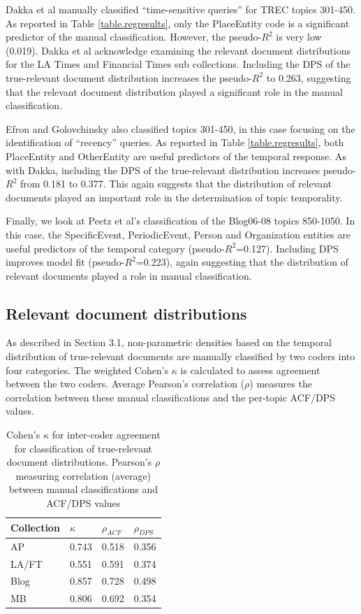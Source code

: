 \documentclass{sig-alternate}
\begin{document}
Dakka et al manually classified ``time-sensitive queries'' for TREC topics 301-450. As reported in Table \ref{table.regresults}, only the PlaceEntity code is a significant predictor of the manual classification. However, the pseudo-$R^2$ is very low (0.019).  Dakka et al acknowledge examining the relevant document distributions for the LA Times and Financial Times sub collections.  Including the DPS of the true-relevant document distribution increases the pseudo-$R^2$ to 0.263, suggesting that the relevant document distribution played a significant role in the manual classification.

Efron and Golovchinsky also classified topics 301-450, in this case focusing on the identification of ``recency'' queries. As reported in Table \ref{table.regresults}, both PlaceEntity and OtherEntity are useful predictors of the temporal response. As with Dakka, including the DPS of the true-relevant distribution increases pseudo-$R^2$ from 0.181 to 0.377. This again suggests that the distribution of relevant documents played an important role in the determination of topic temporality.

Finally, we look at Peetz et al's classification of the Blog06-08 topics 850-1050. In this case, the SpecificEvent, PeriodicEvent, Person and Organization entities are useful predictors of the temporal category (pseudo-$R^2$=0.127). Including DPS  improves model fit (pseudo-$R^2$=0.223), again suggesting that the distribution of relevant documents played a role in manual classification.

\subsection{Relevant document distributions}

As described in Section 3.1, non-parametric densities based on the temporal distribution of true-relevant documents are manually classified by two coders into four categories.  The weighted Cohen's $\kappa$ is calculated to assess agreement between the two coders.  Average Pearson's correlation ($\rho$) measures the correlation between these manual classifications and the per-topic ACF/DPS values.  

\begin{table}
\centering
\begin{tabular}{| l | l | l | l | } \hline
\bf{Collection} & \bf{$\kappa$}  & \bf{$\rho_{ACF}$} & \bf{$\rho_{DPS}$} \\ \hline
AP 	   & 0.743 & 0.518 & 0.356 \\ \hline
LA/FT & 0.551 & 0.591 & 0.374 \\ \hline
Blog    & 0.857 & 0.728 & 0.498 \\ \hline
MB      & 0.806 & 0.692 & 0.354 \\ \hline 
\end{tabular}
\caption{Cohen's $\kappa$ for inter-coder agreement for classification of true-relevant document distributions. Pearson's $\rho$ measuring correlation (average) between manual classifications and ACF/DPS values}
\label{table.cor}
\end{table}
\end{document}
